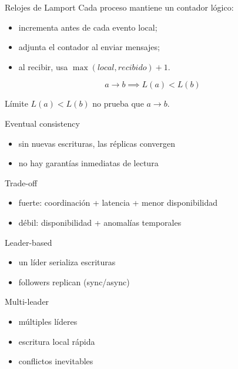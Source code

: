 \documentclass[institutional,screen,none]{ua-engineering-v6-beamer}
\begin{document}
\begin{frame}{Relojes de Lamport}
Cada proceso mantiene un contador lógico:
\begin{itemize}
\item incrementa antes de cada evento local;
\item adjunta el contador al enviar mensajes;
\item al recibir, usa $\max(local, recibido)+1$.
\end{itemize}

\pause
\[
a \rightarrow b \implies L(a) < L(b)
\]

\begin{alertblock}{Límite}
$L(a)<L(b)$ no prueba que $a \rightarrow b$.
\end{alertblock}
\end{frame}

\begin{frame}{Eventual consistency}
\begin{itemize}
\item sin nuevas escrituras, las réplicas convergen
\item no hay garantías inmediatas de lectura
\end{itemize}
\end{frame}

\begin{frame}{Trade-off}
\begin{itemize}
\item fuerte: coordinación + latencia + menor disponibilidad
\item débil: disponibilidad + anomalías temporales
\end{itemize}
\end{frame}


\begin{frame}{Leader-based}
\begin{itemize}
\item un líder serializa escrituras
\item followers replican (sync/async)
\end{itemize}
\end{frame}

\begin{frame}{Multi-leader}
\begin{itemize}
\item múltiples líderes
\item escritura local rápida
\item conflictos inevitables
\end{itemize}
\end{frame}
\end{document}
